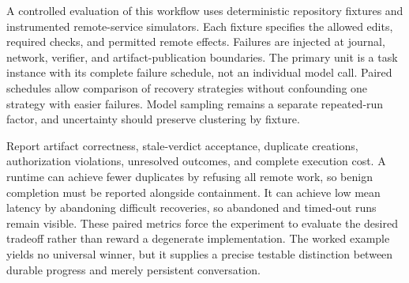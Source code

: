A controlled evaluation of this workflow uses deterministic repository fixtures and instrumented remote-service simulators. Each fixture specifies the allowed edits, required checks, and permitted remote effects. Failures are injected at journal, network, verifier, and artifact-publication boundaries. The primary unit is a task instance with its complete failure schedule, not an individual model call. Paired schedules allow comparison of recovery strategies without confounding one strategy with easier failures. Model sampling remains a separate repeated-run factor, and uncertainty should preserve clustering by fixture.

Report artifact correctness, stale-verdict acceptance, duplicate creations, authorization violations, unresolved outcomes, and complete execution cost. A runtime can achieve fewer duplicates by refusing all remote work, so benign completion must be reported alongside containment. It can achieve low mean latency by abandoning difficult recoveries, so abandoned and timed-out runs remain visible. These paired metrics force the experiment to evaluate the desired tradeoff rather than reward a degenerate implementation. The worked example yields no universal winner, but it supplies a precise testable distinction between durable progress and merely persistent conversation.
